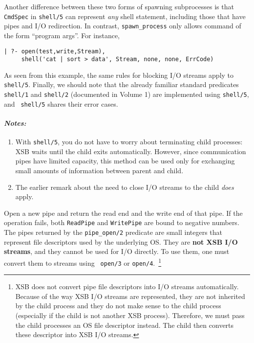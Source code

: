 \begin{description}
  Another difference between these two forms of spawning subprocesses is
  that {\tt CmdSpec} in {\tt shell/5} can represent \emph{any} shell
  statement, including those that have pipes and I/O redirection. In
  contrast, \verb|spawn_process| only allows command of the form ``program
  args''. For instance,
\begin{verbatim}
| ?- open(test,write,Stream),
     shell('cat | sort > data', Stream, none, none, ErrCode)
\end{verbatim}
As seen from this example, the same rules for blocking I/O streams
apply to {\tt shell/5}. Finally, we should note that the already
familiar standard predicates {\tt shell/1} and {\tt shell/2}
(documented in Volume 1) are implemented using {\tt shell/5}, and {\tt
  shell/5} shares their error cases.

\paragraph{\em Notes:}
\begin{enumerate}
  \item  With {\tt shell/5}, you do not have to worry about terminating
    child processes: XSB waits until the child exits automatically.
    However, since communication pipes have limited capacity, this method
    can be used only for exchanging small amounts of information between
    parent and child.
  \item The earlier remark about the need to close I/O streams to the child
    \emph{does} apply.
\end{enumerate}

Open a new pipe and return the read end and the write end of that
pipe.  If the operation fails, both {\tt ReadPipe} and {\tt WritePipe}
are bound to negative numbers.
%  
The pipes returned by the {\tt pipe\_open/2} predicate are small
integers that represent file descriptors used by the underlying
OS. They are {\bf not XSB I/O streams}, and they cannot be used for
I/O directly. To use them, one must convert them to streams using {\tt
open/3} or {\tt open/4}.~\footnote{
XSB does not convert pipe file descriptors into I/O streams
automatically.  Because of the way XSB I/O streams are represented,
they are not inherited by the child process and they do not make sense
to the child process (especially if the child is not another XSB
process). Therefore, we must pass the child processes an OS file
descriptor instead. The child then converts these descriptor into XSB
I/O streams.  
}


\end{description}

